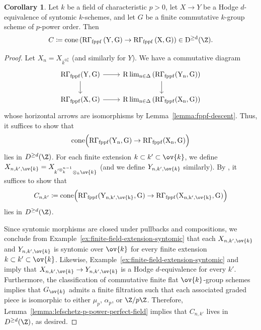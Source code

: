 \documentclass[11pt,reqno]{amsart}
\numberwithin{equation}{section}
\theoremstyle{definition}
\newtheorem{cor}[thm]{Corollary}
\begin{document}
\begin{cor}\label{cor:lefschetz-p-power} Let $k$ be a field of characteristic $p>0$, let $X \to Y$ be a Hodge $d$-equivalence of syntomic $k$-schemes, and let $G$ be a finite commutative $k$-group scheme of $p$-power order. Then 
\[
C\coloneqq \rm{cone}\left(\rm{R}\Gamma_{\rm{fppf}}\left(Y, G\right) \to \rm{R}\Gamma_{\rm{fppf}}\left(X, G\right)\right) \in D^{\geq d}(\Z).
\]
\end{cor}

\begin{proof}
    Let $X_n = X_{\overline{k}^{\otimes^n_k}}$ (and similarly for $Y$). We have a commutative diagram
    \[
    \begin{tikzcd}
        \rm{R}\Gamma_{\rm{fppf}}(Y, G) \arrow{d} \arrow{r} & \rm{R}\lim_{n\in \Delta}\left(\rm{R}\Gamma_{\rm{fppf}}(Y_{n}, G) \right) \arrow{d} \\
        \rm{R}\Gamma_{\rm{fppf}}(X, G) \arrow{r} & \rm{R}\lim_{n\in \Delta}\left(\rm{R}\Gamma_{\rm{fppf}}(X_{n}, G) \right)
    \end{tikzcd}
    \]
    whose horizontal arrows are isomorphisms by Lemma~\ref{lemma:fppf-descent}. Thus, it suffices to show that 
    \[
    \rm{cone}\Big(\rm{R}\Gamma_{\rm{fppf}}(Y_{n}, G) \to \rm{R}\Gamma_{\rm{fppf}}(X_{n}, G)\Big)
    \]
    lies in $D^{\geq d}(\Z)$. For each finite extension $k\subset k'\subset \ov{k}$, we define $X_{n, k', \ov{k}} = X_{k'^{\otimes^{n-1}_k} \otimes_k \ov{k}}$ (and we define $Y_{n, k', \ov{k}}$ similarly).
    By \cite[Lemma 2.1]{Cesnavicius2015}, it suffices to show that 
    \[
    C_{n, k'} \coloneqq \rm{cone}\Big(\rm{R}\Gamma_{\rm{fppf}}(Y_{n, k', \ov{k}}, G) \to \rm{R}\Gamma_{\rm{fppf}}(X_{n, k', \ov{k}}, G)\Big)
    \]
    lies in $D^{\geq d}(\Z)$. \smallskip
    
    Since syntomic morphisms are closed under pullbacks and compositions, we conclude from Example~\ref{ex:finite-field-extension-syntomic} that each $X_{n, k', \ov{k}}$ and $Y_{n, k', \ov{k}}$ is syntomic over $\ov{k}$ for every finite extension $k\subset k' \subset \ov{k}$. Likewise, Example~\ref{ex:finite-field-extension-syntomic} and \cite[Prop.~5.10(1)]{ABM} imply that $X_{n, k', \ov{k}} \to Y_{n, k', \ov{k}}$ is a Hodge $d$-equivalence for every $k'$. Furthermore, the classification of commutative finite flat $\ov{k}$-group schemes implies that $G_{\ov{k}}$ admits a finite filtration such that each associated graded piece is isomorphic to either $\mu_p$, $\alpha_p$, or $\Z/p\Z$. Therefore, Lemma~\ref{lemma:lefschetz-p-power-perfect-field} implies that $C_{n, k'}$ lives in $D^{\geq d}(\Z)$, as desired.
\end{proof}
\end{document}

